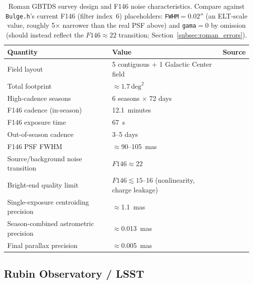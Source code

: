 \documentclass[english,10pt,a4paper]{article}
\begin{document}
	\begin{table}[htbp]
		\centering
		\begin{tabular}{lll}
			\toprule
			Quantity & Value & Source \\
			\midrule
			Field layout & 5 contiguous + 1 Galactic Center field & \cite{ROTAC2025} \\
			Total footprint & $\approx1.7\,\mathrm{deg}^2$ & \cite{ROTAC2025} \\
			High-cadence seasons & 6 seasons $\times$ 72 days & \cite{ROTAC2025} \\
			F146 cadence (in-season) & 12.1~minutes & \cite{ROTAC2025} \\
			F146 exposure time & 67~s & \cite{ROTAC2025} \\
			Out-of-season cadence & 3--5 days & \cite{ROTAC2025} \\
			F146 PSF FWHM & $\approx$90--105~mas & \cite{Fardeen2024PBH,ROTAC2025} \\
			Source/background noise transition & $F146\approx22$ & \cite{Wilson2023GBTDS} \\
			Bright-end quality limit & $F146\lesssim15$--16 (nonlinearity, charge leakage) & \cite{Wilson2023GBTDS} \\
			Single-exposure centroiding precision & $\approx$1.1~mas & \cite{Fardeen2024PBH} \\
			Season-combined astrometric precision & $\approx$0.013~mas & \cite{Fardeen2024PBH} \\
			Final parallax precision & $\approx$0.005~mas & \cite{Fardeen2024PBH} \\
			\bottomrule
		\end{tabular}
		\caption{Roman GBTDS survey design and F146 noise characteristics. Compare against \texttt{Bulge.h}'s current F146 (filter index~6) placeholders: \texttt{FWHM}$=0.02''$ (an ELT-scale value, roughly 5$\times$ narrower than the real PSF above) and \texttt{gama}$=0$ by omission (should instead reflect the $F146\approx22$ transition; Section~\ref{subsec:roman_errors}).}
		\label{tab:gbtds_design}
	\end{table}
	
	\subsection{Rubin Observatory / LSST}
	
\end{document}
